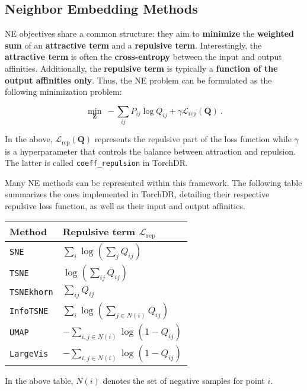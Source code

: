 \subsection{Neighbor Embedding Methods}

NE objectives share a common structure: they aim to \textbf{minimize} the \textbf{weighted sum} of an \textbf{attractive term} and a \textbf{repulsive term}. Interestingly, the \textbf{attractive term} is often the \textbf{cross-entropy} between the input and output affinities. Additionally, the \textbf{repulsive term} is typically a \textbf{function of the output affinities only}. Thus, the NE problem can be formulated as the following minimization problem:

\[
\min_{\mathbf{Z}} \: - \sum_{ij} P_{ij} \log Q_{ij} + \gamma \mathcal{L}_{\mathrm{rep}}(\mathbf{Q}) \:.
\]

In the above, \(\mathcal{L}_{\mathrm{rep}}(\mathbf{Q})\) represents the repulsive part of the loss function while \(\gamma\) is a hyperparameter that controls the balance between attraction and repulsion. The latter is called \texttt{coeff\_repulsion} in TorchDR.

Many NE methods can be represented within this framework. The following table summarizes the ones implemented in TorchDR, detailing their respective repulsive loss function, as well as their input and output affinities.

\begin{tabular}{|l|l|}
    \hline
    \textbf{Method} & \textbf{Repulsive term} \(\mathcal{L}_{\mathrm{rep}}\) \\
    \hline
    \texttt{SNE} & \(\sum_{i} \log(\sum_j Q_{ij})\) \\
    \hline
    \texttt{TSNE} & \(\log(\sum_{ij} Q_{ij})\) \\
    \hline
    \texttt{TSNEkhorn} & \(\sum_{ij} Q_{ij}\) \\
    \hline
    \texttt{InfoTSNE} & \(\sum_i \log(\sum_{j \in N(i)} Q_{ij})\) \\
    \hline
    \texttt{UMAP} & \(- \sum_{i, j \in N(i)} \log (1 - Q_{ij})\) \\
    \hline
    \texttt{LargeVis} & \(- \sum_{i, j \in N(i)} \log (1 - Q_{ij})\) \\
    \hline
\end{tabular}
    

In the above table, \(N(i)\) denotes the set of negative samples for point \(i\).



